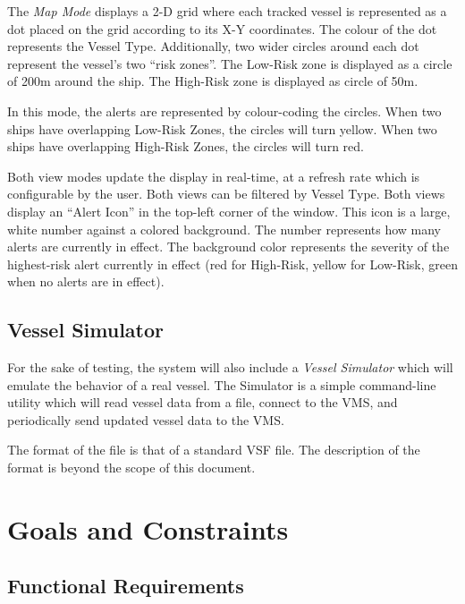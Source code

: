 \documentclass{article}
\begin{document}
The \emph{Map Mode} displays a 2-D grid where each tracked vessel is represented as a dot placed on the grid according to its X-Y coordinates. The colour of the dot represents the Vessel Type. Additionally, two wider circles around each dot represent the vessel's two ``risk zones''. The Low-Risk zone is displayed as a circle of 200m around the ship. The High-Risk zone is displayed as circle of 50m.

In this mode, the alerts are represented by colour-coding the circles. When two ships have overlapping Low-Risk Zones, the circles will turn yellow. When two ships have overlapping High-Risk Zones, the circles will turn red.

Both view modes update the display in real-time, at a refresh rate which is configurable by the user. Both views can be filtered by Vessel Type. Both views display an ``Alert Icon'' in the top-left corner of the window. This icon is a large, white number against a colored background. The number represents how many alerts are currently in effect. The background color represents the severity of the highest-risk alert currently in effect (red for High-Risk, yellow for Low-Risk, green when no alerts are in effect).

\subsection{Vessel Simulator}

For the sake of testing, the system will also include a \emph{Vessel Simulator} which will emulate the behavior of a real vessel. The Simulator is a simple command-line utility which will read vessel data from a file, connect to the VMS, and periodically send updated vessel data to the VMS.

The format of the file is that of a standard VSF file. The description of the format is beyond the scope of this document.

\break
\section{Goals and Constraints} %

\subsection{Functional Requirements} %


\end{document}

